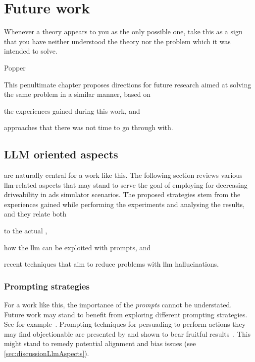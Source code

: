 \chapter{Future work}\label{chp:furtherWork}

\epigraph{Whenever a theory appears to you as the only possible one, take this as a sign that you have neither understood the theory nor the problem which it was intended to solve.}{Popper}

This penultimate chapter proposes directions for future research aimed at
solving the same problem in a similar
manner, based on \begin{inparaenum}
    \item the experiences gained during this work, and
    \item approaches that there was not time to go through with.
\end{inparaenum}

\section{LLM oriented aspects}\label{sec:fwLlm}

 are naturally central for a work like this. The following
section reviews various \acrshort{llm}-related aspects that may stand to
serve the goal of employing  for decreasing driveability in
\acrshort{ads} simulator scenarios. The proposed strategies stem from the
experiences gained while performing the experiments and analysing the results,
and they relate both \begin{inparaenum}
    \item  to the actual ,
    \item  how the \acrshort{llm} can be exploited with prompts, and
    \item recent techniques that aim to reduce problems with \acrshort{llm} hallucinations.
\end{inparaenum}

\subsection{Prompting strategies}

For a work like this, the importance of the \emph{prompts} cannot be understated. Future work may
stand to benefit from exploring different prompting strategies. See for
example~\cite{girayPromptEngineering23}. Prompting techniques for persuading  to
perform actions they may find objectionable are presented by \citeauthor{meincke2025overtale} and
shown to bear fruitful results~\cite[1]{meincke2025overtale}. This might stand to remedy potential
alignment and bias issues (see \cref{sec:discussionLlmAspects}).

